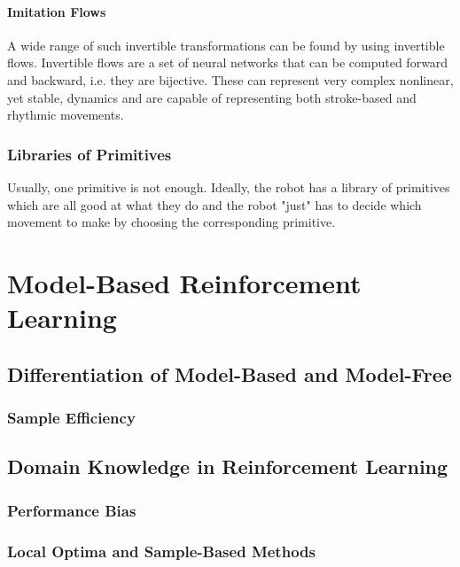 			\subsubsection{Imitation Flows}
				A wide range of such invertible transformations can be found by using invertible flows. Invertible flows are a set of neural networks that can be computed forward and backward, i.e. they are bijective. These can represent very complex nonlinear, yet stable, dynamics and are capable of representing both stroke-based and rhythmic movements.

		\subsection{Libraries of Primitives}
			Usually, one primitive is not enough. Ideally, the robot has a library of primitives which are all good at what they do and the robot "just" has to decide which movement to make by choosing the corresponding primitive.

\chapter{Model-Based Reinforcement Learning} %
	\label{c:modelBasedRL}


	\section{Differentiation of Model-Based and Model-Free} %

		\subsection{Sample Efficiency} %

	\section{Domain Knowledge in Reinforcement Learning} %

		\subsection{Performance Bias} %

		\subsection{Local Optima and Sample-Based Methods} %

